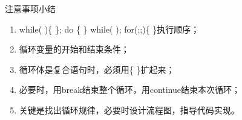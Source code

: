 \begin{frame}{注意事项小结}
\begin{enumerate}
\setlength{\itemsep}{.5cm}
\item while( )\{ \}; do \{ \} while( ); for(;;)\{ \}执行顺序；
\item 循环变量的开始和结束条件；
\item 循环体是复合语句时，必须用\{ \}扩起来；
\item 必要时，用break结束整个循环，用continue结束本次循环；
\item 关键是找出循环规律，必要时设计流程图，指导代码实现。	
\end{enumerate}
\end{frame}